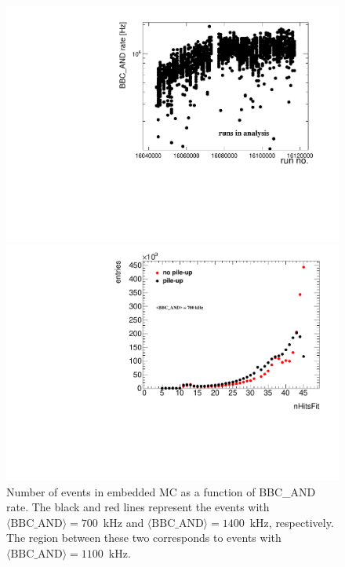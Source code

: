 \begin{figure}[H]%
	\centering%
	\begin{minipage}{.4725\textwidth}%
		\centering%
		\hspace*{-20pt}\includegraphics[width=1.1\linewidth,page=5]{graphics/systematicsEfficiency/bbc_and/Out.pdf}\vspace{-10pt}%
			\caption[Number of events in embedded MC as a function of BBC\_AND rate.]
			{Number of events in embedded MC as a function of BBC\_AND rate. The black and red lines represent the events with \mbox{$\langle\text{BBC\_AND}\rangle=700$~kHz} and \mbox{$\langle\text{BBC\_AND}\rangle=1400$~kHz},  respectively. The region between these two corresponds to events with \mbox{$\langle\text{BBC\_AND}\rangle=1100$~kHz}.}\label{fig:events_bbc_and}%
	\end{minipage}%
	\quad\quad%
	\begin{minipage}{.4725\textwidth}%
		\centering%
		\hspace*{-20pt}\includegraphics[width=1.1\linewidth,page=4]{graphics/systematicsEfficiency/bbc_and/meanNHits.pdf}\vspace{-10pt}%

\end{minipage}
\end{figure}
